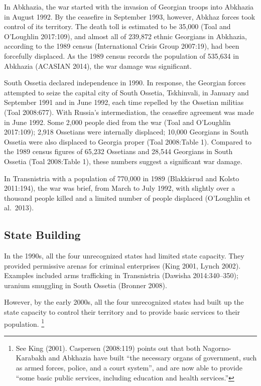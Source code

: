 \documentclass[12pt,a4paper]{article}%
\begin{document}
In Abkhazia, the war started with the invasion of Georgian troops into Abkhazia in August 1992. 
By the ceasefire in September 1993, however, Abkhaz forces took control of its territory.
The death toll is estimated to be 35,000 (Toal and O'Loughlin 2017:109), and almost all of 239,872 ethnic Georgians in Abkhazia, according to the 1989 census (International Crisis Group 2007:19), had been forcefully displaced. 
As the 1989 census records the population of 535,634 in Abkhazia (ACASIAN 2014), the war damage was significant.

South Ossetia declared independence in 1990. 
In response, the Georgian forces attempted to seize the capital city of South Ossetia, Tskhinvali, in January and September 1991 and in June 1992, each time repelled by the Ossetian militias (Toal 2008:677).
With Russia's intermediation, the ceasefire agreement was made in June 1992.
Some 2,000 people died from the war (Toal and O'Loughlin 2017:109); 2,918 Ossetians were internally displaced; 10,000 Georgians in South Ossetia were also displaced to Georgia proper (Toal 2008:Table 1). 
Compared to the 1989 census figures of 65,232 Ossetians and 28,544 Georgians in South Ossetia (Toal 2008:Table 1), these numbers suggest a significant war damage.

In Transnistria with a population of 770,000 in 1989 (Blakkisrud and Kolsto 2011:194), the war was brief, from March to July 1992, with slightly over a thousand people killed and a limited number of people displaced (O'Loughlin et al.\ 2013). 

\subsection{State Building}\label{state-building}
In the 1990s, all the four unrecognized states had limited state capacity.
They provided permissive arenas for criminal enterprises (King 2001, Lynch 2002).
Examples included arms trafficking in Transnistria (Dawisha 2014:340--350); uranium smuggling in South Ossetia (Bronner 2008).

However, by the early 2000s, all the four unrecognized states had built up the state capacity to control their territory and to provide basic services to their population.%
\footnote{
	See King (2001). 
	Caspersen (2008:119) points out that both Nagorno-Karabakh and Abkhazia have built ``the necessary organs of government, such as armed forces, police, and a court system'', and are now able to provide ``some basic public services, including education and health services.'' 
}
\end{document}
